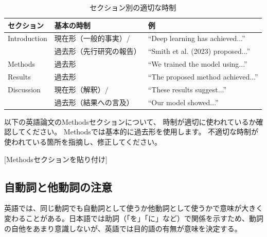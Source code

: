 \begin{table}[htbp]
\centering
\caption{セクション別の適切な時制}
\label{tab:tense}
\footnotesize
\begin{tabular}{lll}
\toprule
セクション & 基本の時制 & 例 \\
\midrule
Introduction & 現在形（一般的事実）/ & ``Deep learning has achieved...'' \\
 & 過去形（先行研究の報告） & ``Smith et al. (2023) proposed...'' \\
Methods & 過去形 & ``We trained the model using...'' \\
Results & 過去形 & ``The proposed method achieved...'' \\
Discussion & 現在形（解釈）/ & ``These results suggest...'' \\
 & 過去形（結果への言及） & ``Our model showed...'' \\
\bottomrule
\end{tabular}
\end{table}

\begin{promptbox}
以下の英語論文のMethodsセクションについて、
時制が適切に使われているか確認してください。
Methodsでは基本的に過去形を使用します。
不適切な時制が使われている箇所を指摘し、修正してください。

{[}Methodsセクションを貼り付け]
\end{promptbox}

\subsection{自動詞と他動詞の注意}
\label{subsec:transitive}

英語では、同じ動詞でも自動詞として使うか他動詞として使うかで意味が大きく変わることがある。日本語では助詞（「を」「に」など）で関係を示すため、動詞の自他をあまり意識しないが、英語では目的語の有無が意味を決定する。

